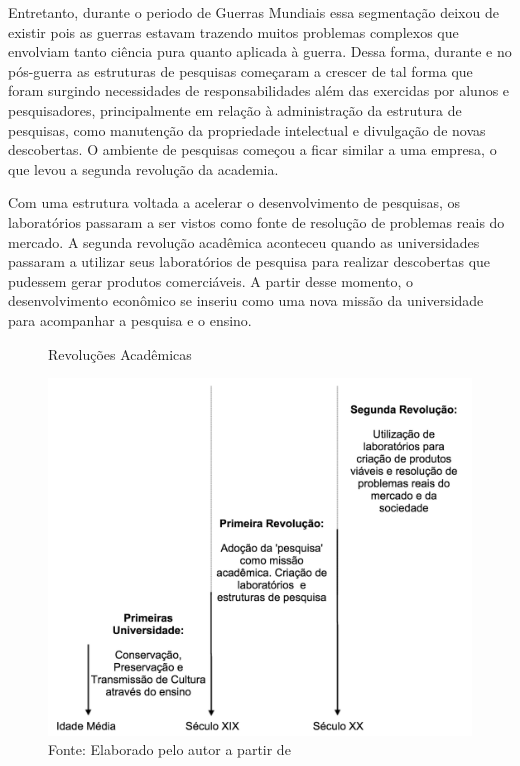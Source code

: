 Entretanto, durante o periodo de Guerras Mundiais essa segmentação deixou de existir pois as guerras estavam trazendo muitos problemas complexos que envolviam tanto ciência pura quanto aplicada à guerra. Dessa forma, durante e no pós-guerra as estruturas de pesquisas começaram a crescer de tal forma que foram surgindo necessidades de responsabilidades além das exercidas por alunos e pesquisadores, principalmente em relação à administração da estrutura de pesquisas, como manutenção da propriedade intelectual e divulgação de novas descobertas. O ambiente de pesquisas começou a ficar similar a uma empresa, o que levou a segunda revolução da academia.

Com uma estrutura voltada a acelerar o desenvolvimento de pesquisas, os laboratórios passaram a ser vistos como fonte de resolução de problemas reais do mercado. A segunda revolução acadêmica aconteceu quando as universidades passaram a utilizar seus laboratórios de pesquisa para realizar descobertas que pudessem gerar produtos comerciáveis. A partir desse momento, o desenvolvimento econômico se inseriu como uma nova missão da universidade para acompanhar a pesquisa e o ensino.

\begin{figure}[h]
\caption{Revoluções Acadêmicas}
\centerline{\includegraphics[scale=0.5]{img/academic_revolutions}}
\label{fig:academic_revolutions}
\caption* {Fonte: Elaborado pelo autor a partir de }
\end{figure}

